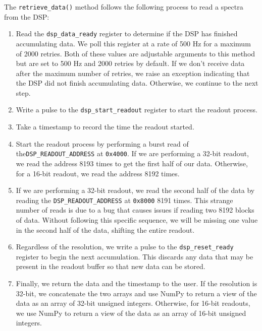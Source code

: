 The \texttt{retrieve\_data()} method follows the following process to read a spectra from the DSP:
\begin{enumerate}
    \item 
        Read the \texttt{dsp\_data\_ready} register to determine if the DSP has finished accumulating data.
        We poll this register at a rate of 500 Hz for a maximum of 2000 retries. 
        Both of these values are adjustable arguments to this method but are set to 500 Hz and 2000 retries by default.
        If we don't receive data after the maximum number of retries, we raise an exception indicating that the DSP did not finish accumulating data.
        Otherwise, we continue to the next step.
    \item 
        Write a pulse to the \texttt{dsp\_start\_readout} register to start the readout process. 
    \item  
        Take a timestamp to record the time the readout started.
    \item 
        Start the readout process by performing a burst read of the\linebreak \texttt{DSP\_READOUT\_ADDRESS} at \texttt{0x4000}. 
        If we are performing a 32-bit readout, we read the address 8193 times to get the first half of our data. 
        Otherwise, for a 16-bit readout, we read the address 8192 times.
    \item 
        If we are performing a 32-bit readout, we read the second half of the data by reading the \texttt{DSP\_READOUT\_ADDRESS} at \texttt{0x8000} 8191 times.
        This strange number of reads is due to a bug that causes issues if reading two 8192 blocks of data.
        Without following this specific sequence, we will be missing one value in the second half of the data, shifting the entire readout. 
    \item 
        Regardless of the resolution, we write a pulse to the \texttt{dsp\_reset\_ready} register to begin the next accumulation.
        This discards any data that may be present in the readout buffer so that new data can be stored. 
    \item 
        Finally, we return the data and the timestamp to the user. 
        If the resolution is 32-bit, we concatenate the two arrays and use NumPy to return a view of the data as an array of 32-bit unsigned integers.
        Otherwise, for 16-bit readouts, we use NumPy to return a view of the data as an array of 16-bit unsigned integers.
\end{enumerate}

